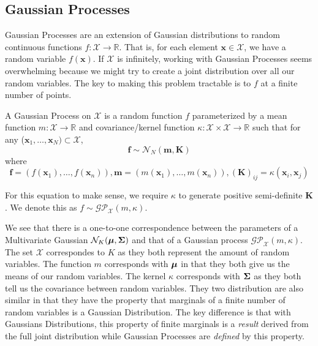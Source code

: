 \subsection{Gaussian Processes}

Gaussian Processes are an extension of Gaussian distributions to random continuous functions $f: \mathcal{X} \to \mathbb{R}$.
That is, for each element $\mathbf{x} \in \mathcal{X}$, we have a random variable $f(\mathbf{x})$.
If $\mathcal{X}$ is infinitely, working with Gaussian Processes seems overwhelming because we might try to create a joint distribution over all our random variables.
The key to making this problem tractable is to $f$ at a finite number of points.

\begin{definition}\label{def:gp}
    A Gaussian Process on $\mathcal{X}$ is a random function $f$ parameterized by a mean function
    $m: \mathcal{X} \to \mathbb{R}$ and covariance/kernel function $\kappa: \mathcal{X} \times \mathcal{X} \to \mathbb{R}$
    such that
    for any ($\mathbf{x}_1, \dots,\mathbf{x}_N) \subset \mathcal{X}$,
    \begin{equation*}
        \mathbf{f} \sim \mathcal{N}_N\left(\mathbf{m}, \mathbf{K}\right)
    \end{equation*}
    where
    \begin{equation*}
        \mathbf{f} = (f(\mathbf{x}_1), \dots, f(\mathbf{x}_n)), \mathbf{m} = (m(\mathbf{x}_1), \dots, m(\mathbf{x}_n)), (\mathbf{K})_{ij} = \kappa(\mathbf{x}_i, \mathbf{x}_j)
    \end{equation*}

    For this equation to make sense, we require $\kappa$ to generate positive semi-definite $\mathbf{K}$.
    We denote this as $f \sim \mathcal{GP}_{\mathcal{X}}(m, \kappa)$.
\end{definition}

We see that there is a one-to-one correspondence between the parameters of a Multivariate Gaussian $\mathcal{N}_{K}(\boldsymbol{\mu}, \boldsymbol{\Sigma})$ and that of a Gaussian process $\mathcal{GP}_{ \mathcal{X}}(m, \kappa)$.
The set $\mathcal{X}$ correspondes to $K$ as they both represent the amount of random variables.
The function $m$ corresponds with $\boldsymbol{\mu}$ in that they both give us the means of our random variables.
The kernel $\kappa$ corresponds with $\boldsymbol{\Sigma}$ as they both tell us the covariance between random variables.
They two distribution are also similar in that they have the property that marginals of a finite number of random variables is a Gaussian Distribution.
The key difference is that with Gaussians Distributions, this property of finite marginals is a \emph{result} derived from the full joint distribution while Gaussian Processes are \emph{defined} by this property.

